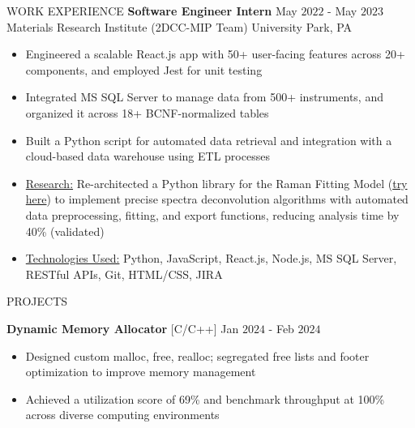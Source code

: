 \documentclass{resume} %
\begin{document}
\begin{rSection}{WORK EXPERIENCE}
{\bf Software Engineer Intern} \hfill May $2022$ - May $2023$\\
Materials Research Institute (2DCC-MIP Team) \hfill University Park, PA
\begin{itemize}[itemsep = -4pt]
    \item Engineered a scalable React.js app with 50+ user-facing features across 20+ components, and employed Jest for unit testing
    \item Integrated MS SQL Server to manage data from 500+ instruments, and organized it across 18+ BCNF-normalized tables
    \item Built a Python script for automated data retrieval and integration with a cloud-based data warehouse using ETL processes
    \item \underline{Research:} Re-architected a Python library for the Raman Fitting Model ({\href{https://github.com/harshitjain17/Raman-Peak-Fitting-Model/}{try here}}) to implement precise spectra deconvolution algorithms with automated data preprocessing, fitting, and export functions, reducing analysis time by 40\% (validated)
    \item \underline{Technologies Used:} Python, JavaScript, React.js, Node.js, MS SQL Server, RESTful APIs, Git, HTML/CSS, JIRA
\end{itemize}

\end{rSection} 



\begin{rSection}{PROJECTS}

{\bf Dynamic Memory Allocator }{[C/C++] } \hfill Jan $2024$ - Feb $2024$
\begin{itemize}[itemsep = -4pt]
    \item Designed custom malloc, free, realloc; segregated free lists and footer optimization to improve memory management
    \item Achieved a utilization score of 69\% and benchmark throughput at 100\% across diverse computing environments
\end{itemize}

\end{rSection}
\end{document}
